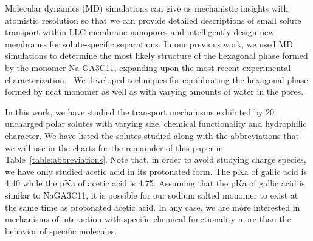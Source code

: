 \documentclass[journal=jpcbfk,manuscript=article]{achemso}
\begin{document}
  Molecular dynamics (MD) simulations can give us mechanistic insights with 
  atomistic resolution so that we can provide detailed descriptions of
  small solute transport within LLC membrane nanopores and intelligently design new membranes for 
  solute-specific separations. In our previous work, we used MD simulations to 
  determine the most likely structure of the hexagonal phase formed by the monomer
  Na-GA3C11, expanding upon the most recent experimental characterization.~\cite{coscia_understanding_2018,feng_thin_2016}
  We developed techniques for equilibrating the hexagonal phase formed by neat 
  monomer as well as with varying amounts of water in the pores.

  In this work, we have studied the transport mechanisms exhibited by 20 
  uncharged polar solutes with varying size, chemical functionality and hydrophilic 
  character. We have listed the solutes studied along with the abbreviations that
  we will use in the charts for the remainder of this paper in Table~\ref{table:abbreviations}.
  Note that, in order to avoid studying charge species, we have only studied
  acetic acid in its protonated form. The pKa of gallic acid is 4.40 while the
  pKa of acetic acid is 4.75. Assuming that the pKa of gallic acid is similar 
  to NaGA3C11, it is possible for our sodium salted monomer to exist at the 
  same time as protonated acetic acid. In any case, we are more interested 
  in mechanisms of interaction with specific chemical functionality more than 
  the behavior of specific molecules.

\end{document}
